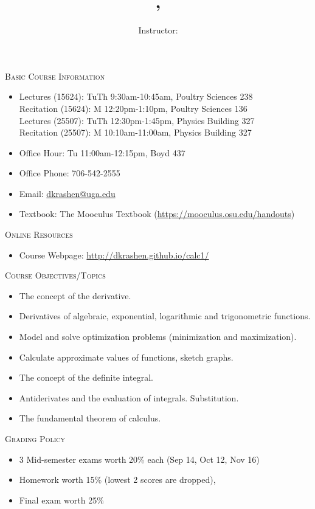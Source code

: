 \documentclass[12pt]{amsart}
\title{\course, \semester}
\author{Instructor: \instructor}
\makeatletter
\newcommand{\schedule}{
Lectures (15624): TuTh 9:30am-10:45am, Poultry Sciences 238 \\
Recitation (15624): M 12:20pm-1:10pm, Poultry Sciences 136 \\
Lectures (25507): TuTh 12:30pm-1:45pm, Physics Building 327 \\
Recitation (25507): M 10:10am-11:00am, Physics Building 327
}
\newcommand{\officehour}{Office Hour: Tu 11:00am-12:15pm, Boyd 437}
\newcommand{\phone}{706-542-2555}
\newcommand{\emailaddr}{dkrashen@uga.edu}
\newcommand{\textbook}{{The Mooculus Textbook}
(\url{https://mooculus.osu.edu/handouts})}
\newcommand{\website}{http://dkrashen.github.io/calc1/}
\makeatother
\begin{document}
\maketitle


\thispagestyle{empty}
\noindent
\textsc{Basic Course Information}

\begin{itemize}
\item
\schedule
\item 
\officehour
\item
Office Phone: \phone
\item
Email: \url{\emailaddr}
\item
Textbook: \textbook
\end{itemize}

\medskip

\noindent
\textsc{Online Resources}

\begin{itemize}
\item
Course Webpage:  
\url{\website} 
\end{itemize}

\medskip

\noindent
\textsc{Course Objectives/Topics}

\begin{itemize}
\item
The concept of the derivative.
\item
Derivatives of algebraic, exponential, logarithmic and trigonometric
functions.
\item
Model and solve optimization problems (minimization and
maximization).
\item
Calculate approximate values of functions, sketch graphs.
\item
The concept of the definite integral.
\item
Antiderivates and the evaluation of integrals. Substitution. 
\item
The fundamental theorem of calculus.
\end{itemize}

\medskip

\noindent
\textsc{Grading Policy}

\begin{itemize}
\item
3 Mid-semester exams worth 20\% each (Sep 14, Oct 12, Nov 16)
\item
Homework worth 15\% (lowest 2 scores are dropped), 
\item
Final exam worth 25\% 
\end{itemize}
\end{document}
